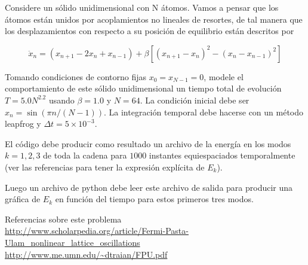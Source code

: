 \documentclass[11pt,letterpaper]{exam}
\begin{document}
\begin{questions}

Considere un s\'olido unidimensional con N \'atomos.
Vamos a pensar que los \'atomos est\'an unidos por acoplamientos no
lineales de resortes, de tal manera que los desplazamientos con respecto
a su posici\'on de equilibrio est\'an descritos por

\begin{equation}
\ddot{x}_n = (x_{n+1} - 2x_n + x_{n-1}) + \beta[(x_{n+1}-x_n)^2 - (x_n - x_{n-1})^2]
\end{equation}

Tomando condiciones de contorno fijas $x_{0}=x_{N-1}=0$, modele el comportamiento
de este s\'olido unidimensional un tiempo total de evoluci\'on $T=5.0N^{2.2}$
usando $\beta=1.0$ y $N=64$. La condici\'on inicial debe ser
$x_n = \sin(\pi n/(N-1))$. La integraci\'on
temporal debe hacerse con un m\'etodo leapfrog y $\Delta t=5\times 10^{-3}$.

El c\'odigo debe producir como resultado un archivo de la energ\'ia en los modos $k=1,2,3$ de toda la cadena para $1000$ instantes equiespaciados
temporalmente (ver las referencias para tener la expresi\'on
expl\'icita de $E_k$).

Luego un archivo de python debe leer este archivo de salida para
producir una gr\'afica de $E_k$ en funci\'on del tiempo para estos
primeros tres modos.  

Referencias sobre este problema\\
\url{http://www.scholarpedia.org/article/Fermi-Pasta-Ulam_nonlinear_lattice_oscillations}\\
\url{http://www.me.umn.edu/~dtraian/FPU.pdf}\\
\end{questions}
\end{document}
